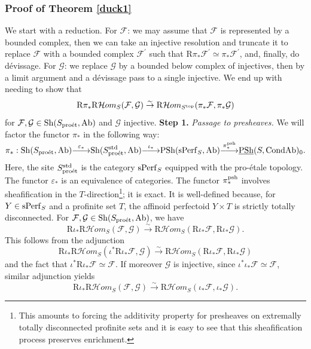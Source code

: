 \documentclass[10pt]{amsart}
\let\cal\mathcal
\theoremstyle{definition}
\theoremstyle{remark}
\def\lomapr#1{\smash{\mathop{\relbar\joinrel\longrightarrow}\limits^{#1}}}
\def\epsilon{\varepsilon}
\newcommand{\proeet}{\operatorname{pro\acute{e}t} }
\newcommand{\Hhom}{{\cal Hom}}
\newcommand{\sff}{{\mathcal{F}}}
\newcommand{\sg}{{\mathcal{G}}}
\numberwithin{equation}{section}
\def\R{{\mathrm R}}
\def\epsilon{\varepsilon}
\numberwithin{equation}{section}
\begin{document}
\subsubsection{Proof of Theorem \ref{duck1}}
We start with  a reduction. For $\sff$: we may assume that $\sff$ is represented by a bounded complex, then we can take an injective resolution and truncate it to replace $\sff$ with a bounded complex $\sff^{\prime}$ such that $\R\pi_*\sff^{\prime}\simeq \pi_*\sff^{\prime}$, and, finally, do d\'evissage. For $\sg$: we replace $\sg$ by a bounded below complex of injectives, then by a limit argument and a d\'evissage pass to a single injective. We end up with needing  to show that 
$$
\R\pi_*\R\Hhom_{S}(\sff,\sg)\stackrel{\sim}{\to }\R\Hhom_{S^{\rm top}}(\pi_*\sff,\pi_*\sg)
$$
for $\sff, \sg\in {\rm Sh}(S_{\proeet}, {\rm Ab})$ and $\sg$ injective.\vskip2mm
{\bf Step 1.} {\em Passage to presheaves.} We will factor the functor  $\pi_*$ in the following way:
$$
\pi_*: {\rm Sh}(S_{\proeet},{\rm Ab})\lomapr{\epsilon_*}{\rm Sh}(S^{\rm std}_{\proeet},{\rm Ab})
\lomapr{\iota_*}{\rm PSh}({\rm sPerf}_S,{\rm Ab})\lomapr{\pi_*^{\rm psh}}\underline{{\rm PSh}}(S,{\rm CondAb})_0.
$$
Here, the site $S^{\rm std}_{\proeet}$ is the category ${\rm sPerf}_S$ equipped with the pro-\'etale topology.  The functor $\epsilon_*$ is an equivalence of categories. The functor $\pi^{\rm psh}_*$ involves sheafification in the $T$-direction\footnote{This amounts to forcing the additivity property for presheaves on extremally totally disconnected profinite sets and it is easy to see that this sheafification process preserves enrichment.}; it is exact.  It is well-defined because, for $Y\in {\rm sPerf}_S$ and a profinite set $T$, the affinoid perfectoid  $Y\times T$ is strictly totally disconnected.   
 For $\sff, \sg\in {\rm Sh}(S_{\proeet},{\rm Ab})$, we have
$$
\R\iota_*\R\Hhom_{S}(\sff,\sg)\stackrel{\sim}{\to} \R\Hhom_{S}(\R\iota_*\sff,\R\iota_*\sg).
$$
This follows from the adjunction
$$
\R\iota_*\R\Hhom_{S}(\iota^*\R\iota_*\sff,\sg)\stackrel{\sim}{\to} \R\Hhom_{S}(\R\iota_*\sff,\R\iota_*\sg)
$$
and the fact that $\iota^*\R\iota_*\sff\simeq \sff$. If moreover $\sg$ is  injective, since $\iota^*\iota_*\sff\simeq \sff$, similar adjunction yields
$$
\R\iota_*\R\Hhom_{S}(\sff,\sg)\stackrel{\sim}{\to} \R\Hhom_{S}(\iota_*\sff,\iota_*\sg).
$$
\vskip2mm
\end{document}
